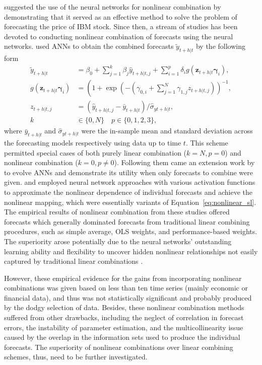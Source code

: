 \documentclass[11pt]{article}
\begin{document}
\cite{Shanming_Shi1993-uk} suggested the use of the neural networks for nonlinear combination by demonstrating that it served as an effective method to solve the problem of forecasting the price of IBM stock. Since then, a stream of studies has been devoted to conducting nonlinear combination of forecasts using the neural networks. \cite{Donaldson1996-um} used ANNs to obtain the combined forecasts $\tilde{y}_{t+h|t}$ by the following form
\begin{align}
\tilde{y}_{t+h|t} &=\beta_{0}+\sum_{j=1}^{k} \beta_{j} \hat{y}_{t+h|t, j}+\sum_{i=1}^{p} \delta_{i} g\left(\mathbf{z}_{t+h|t} \mathbf{\gamma}_{i}\right), \label{eq:nonlinear_sl}\\
g\left(\mathbf{z}_{t+h|t} \mathbf{\gamma}_{i}\right) &=\left(1+\exp \left(-\left(\gamma_{0, i}+\sum_{j=1}^{N} \gamma_{1, j} z_{t+h|t, j}\right)\right)^{-1}\right., \nonumber \\
z_{t+h|t, j} &=\left(\hat{y}_{t+h|t, j}-\bar{y}_{t+h|t}\right) / \hat{\sigma}_{y t+h|t}, \nonumber \\
k & \in \{0,N\} \quad p \in \{0,1,2,3\}, \nonumber
\end{align}
where $\bar{y}_{t+h|t}$ and $\hat{\sigma}_{y t+h|t}$ were the in-sample mean and standard deviation across the forecasting models respectively using data up to time $t$. This scheme permitted special cases of both purely linear combination ($k=N, p=0$) and nonlinear combination ($k=0, p\neq 0$). Following them came an extension work by \cite{Harrald1997-gd} to evolve ANNs and demonstrate its utility when only forecasts to combine were given. \cite{Krasnopolsky2012-xu} and \cite{Babikir2016-xz} employed neural network approaches with various activation functions to approximate the nonlinear dependence of individual forecasts and achieve the nonlinear mapping, which were essentially variants of Equation~\eqref{eq:nonlinear_sl}. The empirical results of nonlinear combination from these studies offered forecasts which generally dominated forecasts from traditional linear combining procedures, such as simple average, OLS weights, and performance-based weights. The superiority arose potentially due to the neural networks' outstanding learning ability and flexibility to uncover hidden nonlinear relationships not easily captured by traditional linear combinations \citep{Donaldson1996-um,Babikir2016-xz}.

However, these empirical evidence for the gains from incorporating nonlinear combinations was given based on less than ten time series (mainly economic or financial data), and thus was not statistically significant and probably produced by the dodgy selection of data. Besides, these nonlinear combination methods suffered from other drawbacks, including the neglect of correlation in forecast errors, the instability of parameter estimation, and the multicollinearity issue caused by the overlap in the information sets used to produce the individual forecasts. The superiority of nonlinear combinations over linear combining schemes, thus, need to be further investigated.
\end{document}
